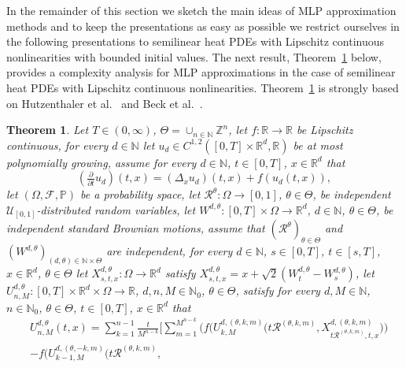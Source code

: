 \documentclass[12pt,AutoFakeBold,AutoFakeSlant]{article}
\newtheorem{theorem}{Theorem}
\theoremstyle{definition}
\newcommand{\R}{\mathbb{R}}
\newcommand{\Z}{\mathbb{Z}}
\renewcommand{\P}{\mathbb{P}}
\newcommand{\N}{\mathbb{N}}
\begin{document}
	In the remainder of this section we sketch the main ideas of MLP approximation methods 
	and to keep the presentations as easy as possible we restrict ourselves in the following 
	presentations to semilinear heat PDEs with Lipschitz continuous nonlinearities 
	with bounded initial values. 
	The next result, Theorem~\ref{thm:MLP_analysis} below, provides a complexity analysis 
	for MLP approximations in the case of semilinear heat PDEs with Lipschitz continuous nonlinearities. 
	Theorem~\ref{thm:MLP_analysis} is strongly based 
	on Hutzenthaler et al.~\cite[Theorem~1.1]{Hutzenthaleretal2018arXiv} and 
	Beck et al.~\cite[Theorem~1.1]{Becketal2019MLP_nonlip_arXiv}. 
	\begin{theorem}
	\label{thm:MLP_analysis}
	Let
	$ T \in (0,\infty) $,
	$ \Theta = \cup_{ n \in \N } \Z^n $, 
	let $ f \colon \R \to \R $ be Lipschitz continuous, 
	for every $ d \in \N $ let 
	$ u_d \in C^{ 1, 2 }( [0,T] \times \R^d, \R ) $
	be at most polynomially growing, 
	assume for every 
	$ d \in \N $, $ t \in [0,T] $,
	$ x \in \R^d $
	that 
	\begin{equation}
	\label{eq:MLP_allen_cahn_pde}
	(\tfrac{\partial}{\partial t}u_d)(t,x) 
	= 
	(\Delta_x u_d)(t,x) 
	+ 
	f(u_d(t,x)),
	\end{equation} 
	let 
	$(\Omega,\mathcal{F},\P)$ 
	be a probability space, 
	let
	$\mathcal{R}^{\theta}\colon \Omega \to [0,1]$, $\theta\in\Theta$, 
	be independent $\mathcal{U}_{[0,1]}$-distributed random variables, 
	let 
	$W^{d,\theta}\colon [0,T]\times\Omega\to\R^d$, 
	$d\in\N$,
	$\theta\in\Theta$,
	be independent standard Brownian motions, 
	assume that 
	$(\mathcal{R}^{\theta})_{\theta\in\Theta}$ 
	and
	$(W^{d,\theta})_{(d,\theta)\in\N\times\Theta}$ 
	are independent, 
	for every 
	$d\in \N$,
	$s\in [0,T]$, 
	$t\in [s,T]$,
	$x\in \R^d$, 
	$\theta\in \Theta$ 
	let 
	$X^{d,\theta}_{s,t,x}\colon\Omega\to\R^d$
	satisfy 
	$
	X^{d,\theta}_{s,t,x}
	= 
	x + \sqrt{2}(W^{d,\theta}_t - W^{d,\theta}_s)
	$, 
	let 
	$U^{d,\theta}_{n,M}\colon [0,T]\times\R^d\times\Omega\to\R$, 
	$d,n,M\in\N_0$,
	$\theta\in\Theta$, 
	satisfy for every 
	$d,M\in\N$,
	$ n \in \N_0 $, 
	$\theta\in\Theta$,
	$t\in [0,T]$, 
	$x\in \R^d$ 
	that
	\begin{align}\label{eq:mlp}
	& 
	U^{d,\theta}_{n,M}(t,x) 
	= 
	\sum_{k=1}^{n-1} \frac{t}{M^{n-k}} 
	\Bigg[ 
	\sum_{m=1}^{M^{n-k}} 
	\bigg(
	f\Big( 
	U^{d,(\theta,k,m)}_{k,M}\big( t \mathcal{R}^{(\theta,k,m)} , 
	X^{d,(\theta,k,m)}_{ t \mathcal{R}^{(\theta,k,m)},t,x}
	\big)
	\Big)
	\\ 
	& 
	-
	f\Big( 
	U^{d,(\theta,-k,m)}_{k-1,M}\big( t \mathcal{R}^{(\theta,k,m)} , 

\end{align}
\end{theorem}
\end{document}
